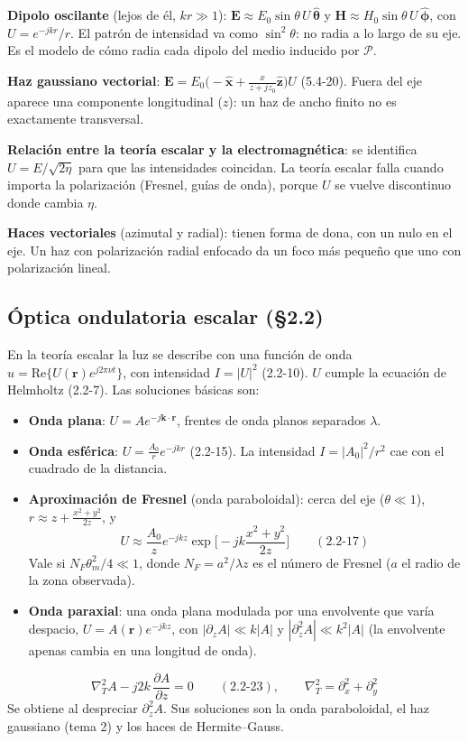 \documentclass[10pt]{article}
\newcommand{\Pc}{\boldsymbol{\mathcal P}}
\newcommand{\E}{\mathbf E}
\newcommand{\Hv}{\mathbf H}
\newcommand{\kv}{\mathbf k}
\newcommand{\rv}{\mathbf r}
\begin{document}
\textbf{Dipolo oscilante} (lejos de él, $kr\gg1$): $\E\approx E_0\sin\theta\,U\,\hat{\boldsymbol\theta}$ y $\Hv\approx H_0\sin\theta\,U\,\hat{\boldsymbol\phi}$, con $U=e^{-jkr}/r$. El patrón de intensidad va como $\sin^2\theta$: no radia a lo largo de su eje. Es el modelo de cómo radia cada dipolo del medio inducido por $\Pc$.

\textbf{Haz gaussiano vectorial}: $\E=E_0\big(-\hat{\mathbf x}+\frac{x}{z+jz_0}\hat{\mathbf z}\big)U$ (5.4-20). Fuera del eje aparece una componente longitudinal ($z$): un haz de ancho finito no es exactamente transversal.

\textbf{Relación entre la teoría escalar y la electromagnética}: se identifica $U=E/\sqrt{2\eta}$ para que las intensidades coincidan. La teoría escalar falla cuando importa la polarización (Fresnel, guías de onda), porque $U$ se vuelve discontinuo donde cambia $\eta$.

\textbf{Haces vectoriales} (azimutal y radial): tienen forma de dona, con un nulo en el eje. Un haz con polarización radial enfocado da un foco más pequeño que uno con polarización lineal.

\subsection{Óptica ondulatoria escalar (§2.2)}
En la teoría escalar la luz se describe con una función de onda $u=\mathrm{Re}\{U(\rv)e^{j2\pi\nu t}\}$, con intensidad $I=|U|^2$ (2.2-10). $U$ cumple la ecuación de Helmholtz (2.2-7). Las soluciones básicas son:
\begin{itemize}
\item \textbf{Onda plana}: $U=Ae^{-j\kv\cdot\rv}$, frentes de onda planos separados $\lambda$.
\item \textbf{Onda esférica}: $U=\frac{A_0}{r}e^{-jkr}$ (2.2-15). La intensidad $I=|A_0|^2/r^2$ cae con el cuadrado de la distancia.
\item \textbf{Aproximación de Fresnel} (onda paraboloidal): cerca del eje ($\theta\ll1$), $r\approx z+\frac{x^2+y^2}{2z}$, y
\[
U\approx\frac{A_0}{z}e^{-jkz}\exp\!\Big[-jk\frac{x^2+y^2}{2z}\Big]\qquad(2.2\text{-}17)
\]
Vale si $N_F\theta_m^2/4\ll1$, donde $N_F=a^2/\lambda z$ es el número de Fresnel ($a$ el radio de la zona observada).
\item \textbf{Onda paraxial}: una onda plana modulada por una envolvente que varía despacio, $U=A(\rv)e^{-jkz}$, con $|\partial_zA|\ll k|A|$ y $|\partial_z^2A|\ll k^2|A|$ (la envolvente apenas cambia en una longitud de onda).
\end{itemize}
\begin{clave}[title={Ecuación de Helmholtz paraxial}]
\[
\nabla_T^2A-j2k\,\frac{\partial A}{\partial z}=0\qquad(2.2\text{-}23),\qquad \nabla_T^2=\partial_x^2+\partial_y^2
\]
Se obtiene al despreciar $\partial_z^2A$. Sus soluciones son la onda paraboloidal, el haz gaussiano (tema 2) y los haces de Hermite–Gauss.
\end{clave}
\end{document}
